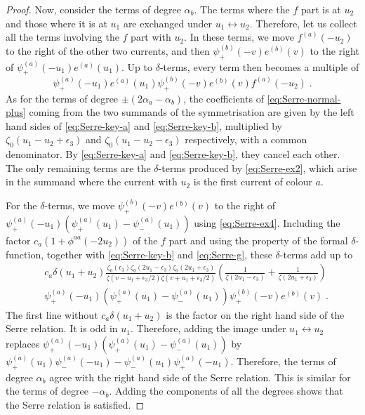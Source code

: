 \documentclass[11pt]{article}
\numberwithin{equation}{section}
\numberwithin{figure}{section}
\numberwithin{table}{section}
\begin{document}
\begin{proof}
	Now, consider the terms of degree $\alpha_b$. The terms where the $f$ part is at $u_2$ and those where it is at $u_1$ are exchanged under $u_1\leftrightarrow u_2$. Therefore, let us collect all the terms involving the $f$ part with $u_2$. In these terms, we move $f^{(a)}(-u_2)$ to the right of the other two currents, and then $\psi^{(b)}_+(-v)e^{(b)}(v)$ to the right of $\psi^{(a)}_+(-u_1)e^{(a)}(u_1)$. Up to $\delta$-terms, every term then becomes a multiple of
	\begin{equation}
		\psi^{(a)}_+(-u_1)e^{(a)}(u_1)\psi^{(b)}_+(-v)e^{(b)}(v)f^{(a)}(-u_2)\;.\label{eq:Serre-normal-plus}
	\end{equation}
	As for the terms of degree $\pm(2\alpha_a-\alpha_b)$, the coefficients of \eqref{eq:Serre-normal-plus} coming from the two summands of the symmetrisation are given by the left hand sides of \eqref{eq:Serre-key-a} and \eqref{eq:Serre-key-b}, multiplied by $\zeta_0(u_1-u_2+\epsilon_3)$ and $\zeta_0(u_1-u_2-\epsilon_3)$ respectively, with a common denominator. By \eqref{eq:Serre-key-a} and \eqref{eq:Serre-key-b}, they cancel each other. The only remaining terms are the $\delta$-terms produced by \eqref{eq:Serre-ex2}, which arise in the summand where the current with $u_2$ is the first current of colour $a$.

	For the $\delta$-terms, we move $\psi_+^{(b)}(-v)e^{(b)}(v)$ to the right of $\psi_+^{(a)}(-u_1)\left(\psi_+^{(a)}(u_1)-\psi_-^{(a)}(u_1)\right)$ using \eqref{eq:Serre-ex4}. Including the factor $c_a\left(1+\phi^{aa}(-2u_2)\right)$ of the $f$ part and using the property of the formal $\delta$-function, together with \eqref{eq:Serre-key-b} and \eqref{eq:Serre-g}, these $\delta$-terms add up to
	\begin{align}
		&c_a\delta(u_1+u_2)\frac{\zeta_0(\epsilon_3)\zeta_0(2u_1-\epsilon_3)\zeta_0(2u_1+\epsilon_3)}{\zeta(v-u_1+\epsilon_3/2)\zeta(v+u_1+\epsilon_3/2)}\left(\frac{1}{\zeta(2u_1-\epsilon_3)}+\frac{1}{\zeta(2u_1+\epsilon_3)}\right)\nonumber\\
		&\psi^{(a)}_+(-u_1)\left(\psi^{(a)}_+(u_1)-\psi^{(a)}_-(u_1)\right)\psi^{(b)}_+(-v)e^{(b)}(v)\;.
	\end{align}
	The first line without $c_a\delta(u_1+u_2)$ is the factor on the right hand side of the Serre relation. It is odd in $u_1$. Therefore, adding the image under $u_1\leftrightarrow u_2$ replaces $\psi^{(a)}_+(-u_1)\left(\psi^{(a)}_+(u_1)-\psi^{(a)}_-(u_1)\right)$ by $\psi^{(a)}_+(u_1)\psi^{(a)}_-(-u_1)-\psi^{(a)}_-(u_1)\psi^{(a)}_+(-u_1)$. Therefore, the terms of degree $\alpha_b$ agree with the right hand side of the Serre relation. This is similar for the terms of degree $-\alpha_b$. Adding the components of all the degrees shows that the Serre relation is satisfied.


\end{proof}
\end{document}
